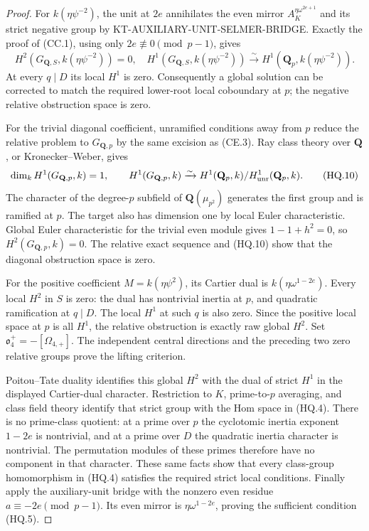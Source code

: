 \begin{proof}
For \(k(\eta\psi^{-2})\), the unit at \(2e\)
annihilates the even mirror
\(A_K^{\eta\omega^{2e+1}}\) and its strict
negative group by KT-AUXILIARY-UNIT-SELMER-BRIDGE.
Exactly the proof of (CC.1), using only
\(2e\not\equiv0\pmod{p-1}\), gives
\[
 H^2(G_{\mathbf Q,S},k(\eta\psi^{-2}))=0,
 \quad H^1(G_{\mathbf Q,S},k(\eta\psi^{-2}))
      \xrightarrow{\sim}H^1(\mathbf Q_p,k(\eta\psi^{-2})).
                                                        \tag{HQ.9}
\]
At every \(q\mid D\) its local \(H^1\) is zero.
Consequently a global solution can be corrected to
match the required lower-root local coboundary at
\(p\); the negative relative obstruction space is zero.

For the trivial diagonal coefficient, unramified
conditions away from \(p\) reduce the relative problem
to \(G_{\mathbf Q,p}\) by the same excision as (CE.3).
Ray class theory over \(\mathbf Q\), or Kronecker--Weber,
gives
\[
 \dim_k H^1(G_{\mathbf Q,p},k)=1,\qquad
 H^1(G_{\mathbf Q,p},k)
    \xrightarrow{\sim}
 H^1(\mathbf Q_p,k)/H^1_{\rm unr}(\mathbf Q_p,k).
                                                        \tag{HQ.10}
\]
The character of the degree-\(p\) subfield of
\(\mathbf Q(\mu_{p^2})\) generates the first group
and is ramified at \(p\).  The target also has
dimension one by local Euler characteristic.
Global Euler characteristic for the trivial even
module gives \(1-1+h^2=0\), so
\(H^2(G_{\mathbf Q,p},k)=0\).
The relative exact sequence and (HQ.10) show that
the diagonal obstruction space is zero.

For the positive coefficient \(M=k(\eta\psi^2)\),
its Cartier dual is \(k(\eta\omega^{1-2e})\).
Every local \(H^2\) in \(S\) is zero: the dual
has nontrivial inertia at \(p\), and quadratic
ramification at \(q\mid D\).  The local \(H^1\)
at such \(q\) is also zero.  Since the positive
local space at \(p\) is all \(H^1\), the relative
obstruction is exactly raw global \(H^2\).
Set \(\mathfrak o_4^+=-[\Omega_{4,+}]\).
The independent central directions and the preceding
two zero relative groups prove the lifting criterion.

Poitou--Tate duality identifies this global \(H^2\)
with the dual of strict \(H^1\) in the displayed
Cartier-dual character.  Restriction to \(K\),
prime-to-\(p\) averaging, and class field theory
identify that strict group with the Hom space in
(HQ.4).  There is no prime-class quotient: at a
prime over \(p\) the cyclotomic inertia exponent
\(1-2e\) is nontrivial, and at a prime over \(D\)
the quadratic inertia character is nontrivial.
The permutation modules of these primes therefore
have no component in that character.  These same
facts show that every class-group homomorphism in
(HQ.4) satisfies the required strict local conditions.
Finally apply the auxiliary-unit bridge with the
nonzero even residue \(a\equiv-2e\pmod{p-1}\).
Its even mirror is \(\eta\omega^{1-2e}\), proving
the sufficient condition (HQ.5).
\end{proof}

